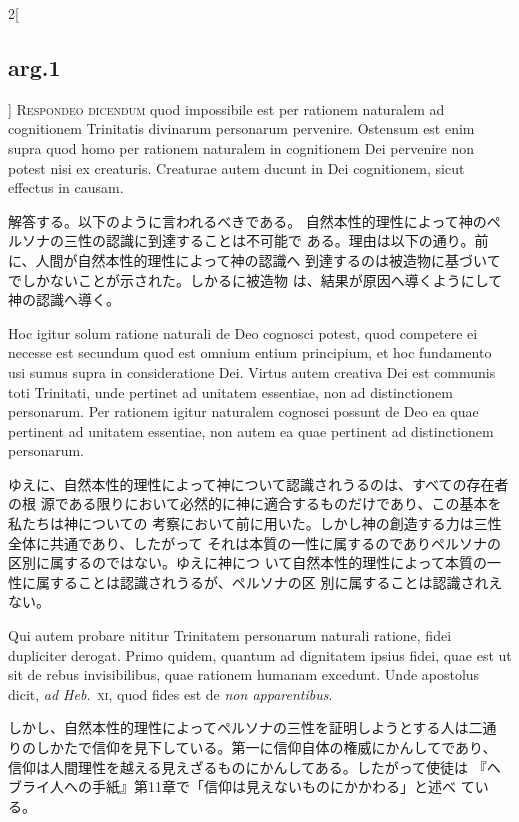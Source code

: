\documentclass[paper=a4paper,fontsize=10pt,jafontsize=9pt,titlepage]{jlreq}
\begin{document}
\begin{paracol}{2}[\subsection{arg.1}]
{\scshape Respondeo dicendum} quod impossibile est per rationem naturalem ad
cognitionem Trinitatis divinarum personarum pervenire. Ostensum est
enim supra quod homo per rationem naturalem in cognitionem Dei
pervenire non potest nisi ex creaturis. Creaturae autem ducunt in Dei
cognitionem, sicut effectus in causam.

\switchcolumn

解答する。以下のように言われるべきである。
自然本性的理性によって神のペルソナの三性の認識に到達することは不可能で
 ある。理由は以下の通り。前に、人間が自然本性的理性によって神の認識へ
 到達するのは被造物に基づいてでしかないことが示された。しかるに被造物
 は、結果が原因へ導くようにして神の認識へ導く。

\switchcolumn*

Hoc igitur solum ratione
naturali de Deo cognosci potest, quod competere ei necesse est
secundum quod est omnium entium principium, et hoc fundamento usi
sumus supra in consideratione Dei. Virtus autem creativa Dei est
communis toti Trinitati, unde pertinet ad unitatem essentiae, non ad
distinctionem personarum. Per rationem igitur naturalem cognosci
possunt de Deo ea quae pertinent ad unitatem essentiae, non autem ea
quae pertinent ad distinctionem personarum.

\switchcolumn

ゆえに、自然本性的理性によって神について認識されうるのは、すべての存在者の根
 源である限りにおいて必然的に神に適合するものだけであり、この基本を私たちは神についての
 考察において前に用いた。しかし神の創造する力は三性全体に共通であり、したがって
 それは本質の一性に属するのでありペルソナの区別に属するのではない。ゆえに神につ
 いて自然本性的理性によって本質の一性に属することは認識されうるが、ペルソナの区
 別に属することは認識されえない。

\switchcolumn*

Qui autem probare nititur
Trinitatem personarum naturali ratione, fidei dupliciter
derogat. Primo quidem, quantum ad dignitatem ipsius fidei, quae est ut
sit de rebus invisibilibus, quae rationem humanam excedunt. Unde
apostolus dicit, {\itshape ad Heb}.~{\scshape xi}, quod fides est de {\itshape non apparentibus}.

\switchcolumn

しかし、自然本性的理性によってペルソナの三性を証明しようとする人は二通
 りのしかたで信仰を見下している。第一に信仰自体の権威にかんしてであり、
 信仰は人間理性を越える見えざるものにかんしてある。したがって使徒は
 『ヘブライ人への手紙』第11章で「信仰は見えないものにかかわる」と述べ
 ている。


\end{paracol}
\end{document}
